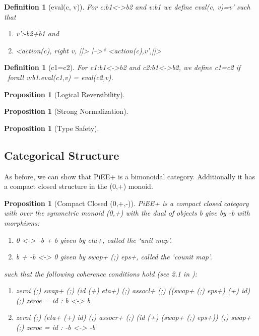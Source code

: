\documentclass[preprint]{sigplanconf}
\newtheorem{definition}[theorem]{Definition}
\newtheorem{proposition}[theorem]{Proposition}
\begin{document}
\begin{definition}[{{eval(c, v)}}]
For {{c:b1<->b2}} and {{v:b1}} we define {{eval(c, v)=v'}} such that
\begin{enumerate}
\item {{v':-b2+b1}} and
\item {{<action(c), right v, []> |-->* <action(c),v',[]>^^^}}
\end{enumerate}
\end{definition}

\begin{definition}[{{c1=c2}}]
  For {{c1:b1<->b2}} and {{c2:b1<->b2}}, we define {{c1=c2}} if
  {{~forall v:b1.eval(c1,v) = eval(c2,v)}}.
\end{definition}

\begin{proposition}[Logical Reversibility]
  
\end{proposition}

\begin{proposition}[Strong Normalization]
  
\end{proposition}

\begin{proposition}[Type Safety]
  
\end{proposition}

\subsection{Categorical Structure}

As before, we can show that {{PiEE+}} is a bimonoidal
category. Additionally it has a compact closed structure in the
{{(0,+)}} monoid.

\begin{proposition}[Compact Closed {{(0,+,-)}}]
  {{PiEE+}} is a compact closed category with over the symmetric
  monoid {{(0,+)}} with the dual of objects {{b}} give by {{-b}} with
  morphisms:

\begin{enumerate}
\item {{0 <-> -b + b}} given by {{eta+}}, called the `unit map'.
\item {{b + -b <-> 0}} given by {{swap+ (;) eps+}}, called the `counit map'.
\end{enumerate}

\noindent
such that the following coherence conditions hold (see 2.1 in
\cite{selinger2007dagger}):


\begin{enumerate}
\item {{zeroi (;) swap+ (;) (id (+) eta+) (;) assocl+ (;) ((swap+ (;) eps+) (+) id) (;) zeroe = id : b <-> b}}
\item {{zeroi (;) (eta+ (+) id) (;) assocr+ (;) (id (+) (swap+ (;) eps+)) (;) swap+ (;) zeroe = id : -b <-> -b}}
\end{enumerate}

\end{proposition}
\end{document}
